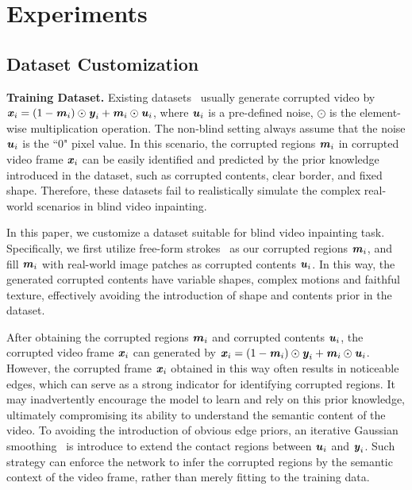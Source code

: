 \section{Experiments}
\label{Experiments}

\subsection{Dataset Customization}
\noindent\textbf{Training Dataset.}
Existing datasets~\cite{lee2019cpnet,chang2019free,yan2020sttn,Kang2022ErrorCF} usually generate corrupted video by ${\textbf{\emph{x}}_i}=(1-{\textbf{\emph{m}}_i})\odot{\textbf{\emph{y}}_i}+{\textbf{\emph{m}}_i}\odot{\textbf{\emph{u}}_i}$, where ${\textbf{\emph{u}}_i}$ is a pre-defined noise,  $\odot$ is the element-wise multiplication operation.
The non-blind setting always assume that the noise ${\textbf{\emph{u}}_i}$ is the “0" pixel value.
In this scenario, the corrupted regions $\textbf{\emph{m}}_i$ in corrupted video frame ${\textbf{\emph{x}}_i}$ can be easily identified and predicted by the prior knowledge introduced in the dataset, such as corrupted contents, clear border, and fixed shape.
Therefore, these datasets fail to realistically simulate the complex real-world scenarios in blind video inpainting.

In this paper, we customize a dataset suitable for blind video inpainting task. 
Specifically, we first utilize free-form strokes~\cite{chang2019free} as our corrupted regions ${\textbf{\emph{m}}_i}$, and fill ${\textbf{\emph{m}}_i}$ with real-world image patches as corrupted contents ${\textbf{\emph{u}}_i}$.
In this way, the generated corrupted contents have variable shapes, complex motions and faithful texture, effectively avoiding the introduction of shape and contents prior in the dataset.

After obtaining the corrupted regions ${\textbf{\emph{m}}_i}$ and corrupted contents ${\textbf{\emph{u}}_i}$, 
the corrupted video frame ${\textbf{\emph{x}}_i}$ can generated by ${\textbf{\emph{x}}_i}=(1-{\textbf{\emph{m}}_i})\odot{\textbf{\emph{y}}_i}+{\textbf{\emph{m}}_i}\odot{\textbf{\emph{u}}_i}$. 
However, the corrupted frame ${\textbf{\emph{x}}_i}$ obtained in this way often results in noticeable edges, which can serve as a strong indicator for identifying corrupted regions.
It may inadvertently encourage the model to learn and rely on this prior knowledge, ultimately compromising its ability to understand the semantic content of the video.
To avoiding the introduction of obvious edge priors, an iterative Gaussian smoothing~\cite{wang2018image} is introduce to extend the contact regions between ${\textbf{\emph{u}}_i}$ and ${\textbf{\emph{y}}_i}$. 
Such strategy can enforce the network to infer the corrupted regions by the semantic context of the video frame, rather than merely fitting to the training data.

